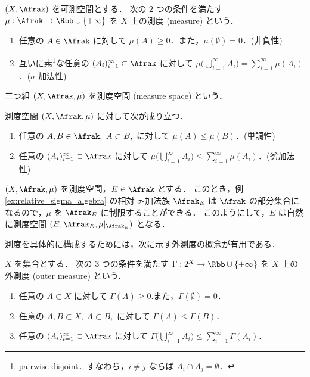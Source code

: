 \begin{definition}
    $(X,\Afrak)$ を可測空間とする．
    次の $2$ つの条件を満たす $\mu:\Afrak\to\Rbb\cup\{+\infty\}$ を $X$ 上の測度 (measure) という．
    \begin{enumerate}[label=\textsf{(M\arabic*)},align=left]
        \item\label{item:m1} 任意の $A\in\Afrak$ に対して $\mu(A)\ge0$．また，$\mu(\emptyset)=0$．\qquad (非負性)
        \item\label{item:m2} 互いに素\footnote{pairwise disjoint．すなわち，$i\ne j$ ならば $A_i\cap A_j=\emptyset$．}な任意の $(A_i)_{i=1}^\infty\subset\Afrak$ に対して
            $\displaystyle\mu\biggl(\bigcup_{i=1}^\infty A_i\biggr)=\sum_{i=1}^\infty\mu(A_i)$．\qquad ($\sigma$-加法性)
    \end{enumerate}
    三つ組 $(X,\Afrak,\mu)$ を測度空間 (measure space) という．
\end{definition}

\begin{remark}
    測度空間 $(X,\Afrak,\mu)$ に対して次が成り立つ．
    \begin{enumerate}
        \item 任意の $A,B\in\Afrak,\ A\subset B,$ に対して $\mu(A)\le\mu(B)$．\qquad(単調性)
        \item 任意の $(A_i)_{i=1}^\infty\subset\Afrak$ に対して $\displaystyle\mu\biggl(\bigcup_{i=1}^\infty A_i\biggr)\le\sum_{i=1}^\infty\mu(A_i)$．\qquad(劣加法性)
    \end{enumerate}
\end{remark}

\begin{example}\label{ex:restriction_of_measure}
    $(X,\Afrak,\mu)$ を測度空間，$E\in\Afrak$ とする．
    このとき，例 \ref{ex:relative_sigma_algebra} の相対 $\sigma$-加法族 $\Afrak_E$ は
    $\Afrak$ の部分集合になるので，$\mu$ を $\Afrak_E$ に制限することができる．
    このようにして，$E$ は自然に測度空間 $(E,\Afrak_E,\mu\vert_{\Afrak_E})$ となる．
\end{example}

測度を具体的に構成するためには，次に示す外測度の概念が有用である．

\begin{definition}
    $X$ を集合とする．
    次の $3$ つの条件を満たす $\Gamma:2^X\to\Rbb\cup\{+\infty\}$ を $X$ 上の外測度 (outer measure) という．
    \begin{enumerate}[label=\textsf{(OM\arabic*)},align=left]
        \item\label{item:om1} 任意の $A\subset X$ に対して $\Gamma(A)\ge0$.また，$\Gamma(\emptyset)=0$．
        \item\label{item:om2} 任意の $A,B\subset X,\ A\subset B,$ に対して $\Gamma(A)\le\Gamma(B)$．
        \item\label{item:om3} 任意の $(A_i)_{i=1}^\infty\subset\Afrak$ に対して $\displaystyle\Gamma\biggl(\bigcup_{i=1}^\infty A_i\biggr)\le\sum_{i=1}^\infty\Gamma(A_i)$．
    \end{enumerate}
\end{definition}

